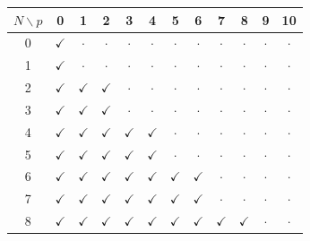 \begin{tabular}{c ccccccccccc}
\toprule
$N\backslash p$ & 0 & 1 & 2 & 3 & 4 & 5 & 6 & 7 & 8 & 9 & 10 \\
\midrule
0 & $\checkmark$ & $\cdot$ & $\cdot$ & $\cdot$ & $\cdot$ & $\cdot$ & $\cdot$ & $\cdot$ & $\cdot$ & $\cdot$ & $\cdot$ \\
1 & $\checkmark$ & $\cdot$ & $\cdot$ & $\cdot$ & $\cdot$ & $\cdot$ & $\cdot$ & $\cdot$ & $\cdot$ & $\cdot$ & $\cdot$ \\
2 & $\checkmark$ & $\checkmark$ & $\checkmark$ & $\cdot$ & $\cdot$ & $\cdot$ & $\cdot$ & $\cdot$ & $\cdot$ & $\cdot$ & $\cdot$ \\
3 & $\checkmark$ & $\checkmark$ & $\checkmark$ & $\cdot$ & $\cdot$ & $\cdot$ & $\cdot$ & $\cdot$ & $\cdot$ & $\cdot$ & $\cdot$ \\
4 & $\checkmark$ & $\checkmark$ & $\checkmark$ & $\checkmark$ & $\checkmark$ & $\cdot$ & $\cdot$ & $\cdot$ & $\cdot$ & $\cdot$ & $\cdot$ \\
5 & $\checkmark$ & $\checkmark$ & $\checkmark$ & $\checkmark$ & $\checkmark$ & $\cdot$ & $\cdot$ & $\cdot$ & $\cdot$ & $\cdot$ & $\cdot$ \\
6 & $\checkmark$ & $\checkmark$ & $\checkmark$ & $\checkmark$ & $\checkmark$ & $\checkmark$ & $\checkmark$ & $\cdot$ & $\cdot$ & $\cdot$ & $\cdot$ \\
7 & $\checkmark$ & $\checkmark$ & $\checkmark$ & $\checkmark$ & $\checkmark$ & $\checkmark$ & $\checkmark$ & $\cdot$ & $\cdot$ & $\cdot$ & $\cdot$ \\
8 & $\checkmark$ & $\checkmark$ & $\checkmark$ & $\checkmark$ & $\checkmark$ & $\checkmark$ & $\checkmark$ & $\checkmark$ & $\checkmark$ & $\cdot$ & $\cdot$ \\
\bottomrule
\end{tabular}
